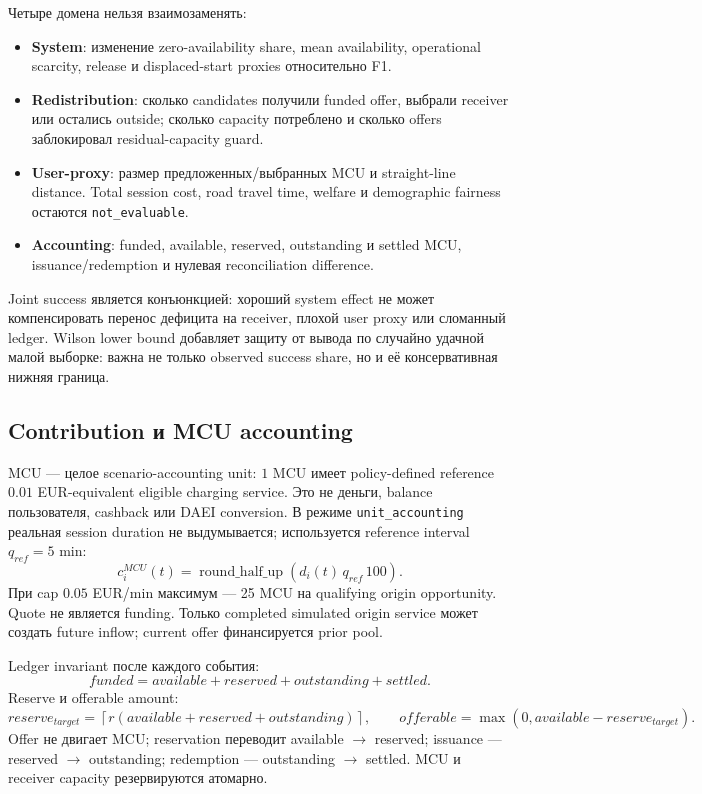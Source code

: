 \documentclass[11pt,a4paper]{article}
\newcommand{\code}[1]{\texttt{#1}}
\begin{document}
Четыре домена нельзя взаимозаменять:
\begin{itemize}
\item \textbf{System}: изменение zero-availability share, mean availability, operational scarcity, release и displaced-start proxies относительно F1.
\item \textbf{Redistribution}: сколько candidates получили funded offer, выбрали receiver или остались outside; сколько capacity потреблено и сколько offers заблокировал residual-capacity guard.
\item \textbf{User-proxy}: размер предложенных/выбранных MCU и straight-line distance. Total session cost, road travel time, welfare и demographic fairness остаются \code{not\_evaluable}.
\item \textbf{Accounting}: funded, available, reserved, outstanding и settled MCU, issuance/redemption и нулевая reconciliation difference.
\end{itemize}
Joint success является конъюнкцией: хороший system effect не может компенсировать перенос дефицита на receiver, плохой user proxy или сломанный ledger. Wilson lower bound добавляет защиту от вывода по случайно удачной малой выборке: важна не только observed success share, но и её консервативная нижняя граница.

\subsection{Contribution и MCU accounting}
MCU --- целое scenario-accounting unit: $1$ MCU имеет policy-defined reference $0.01$ EUR-equivalent eligible charging service. Это не деньги, balance пользователя, cashback или DAEI conversion. В режиме \code{unit\_accounting} реальная session duration не выдумывается; используется reference interval $q_{ref}=5$ min:
\[
c_i^{MCU}(t)=\operatorname{round\_half\_up}\!\left(d_i(t)\,q_{ref}\,100\right).
\]
При cap $0.05$ EUR/min максимум --- 25 MCU на qualifying origin opportunity. Quote не является funding. Только completed simulated origin service может создать future inflow; current offer финансируется prior pool.

Ledger invariant после каждого события:
\[
funded=available+reserved+outstanding+settled.
\]
Reserve и offerable amount:
\[
reserve_{target}=\left\lceil r(available+reserved+outstanding)\right\rceil,
\qquad offerable=\max(0,available-reserve_{target}).
\]
Offer не двигает MCU; reservation переводит available $\to$ reserved; issuance --- reserved $\to$ outstanding; redemption --- outstanding $\to$ settled. MCU и receiver capacity резервируются атомарно.
\end{document}
